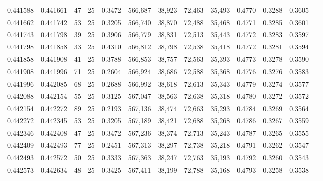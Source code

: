 \begin{tabular}{rrrrrrrrrrrrr}
0.441588 & 0.441661 &    47 &  25 &                                     0.3472 & 566,687 &  38,923 &  72,463 &  35,493 & 0.4770 & 0.3288 & 0.3605 \\
0.441662 & 0.441742 &    53 &  25 &                                     0.3205 & 566,740 &  38,870 &  72,488 &  35,468 & 0.4771 & 0.3285 & 0.3601 \\
0.441743 & 0.441798 &    39 &  25 &                                     0.3906 & 566,779 &  38,831 &  72,513 &  35,443 & 0.4772 & 0.3283 & 0.3597 \\
0.441798 & 0.441858 &    33 &  25 &                                     0.4310 & 566,812 &  38,798 &  72,538 &  35,418 & 0.4772 & 0.3281 & 0.3594 \\
0.441858 & 0.441908 &    41 &  25 &                                     0.3788 & 566,853 &  38,757 &  72,563 &  35,393 & 0.4773 & 0.3278 & 0.3590 \\
0.441908 & 0.441996 &    71 &  25 &                                     0.2604 & 566,924 &  38,686 &  72,588 &  35,368 & 0.4776 & 0.3276 & 0.3583 \\
0.441996 & 0.442085 &    68 &  25 &                                     0.2688 & 566,992 &  38,618 &  72,613 &  35,343 & 0.4779 & 0.3274 & 0.3577 \\
0.442088 & 0.442154 &    55 &  25 &                                     0.3125 & 567,047 &  38,563 &  72,638 &  35,318 & 0.4780 & 0.3272 & 0.3572 \\
0.442154 & 0.442272 &    89 &  25 &                                     0.2193 & 567,136 &  38,474 &  72,663 &  35,293 & 0.4784 & 0.3269 & 0.3564 \\
0.442272 & 0.442345 &    53 &  25 &                                     0.3205 & 567,189 &  38,421 &  72,688 &  35,268 & 0.4786 & 0.3267 & 0.3559 \\
0.442346 & 0.442408 &    47 &  25 &                                     0.3472 & 567,236 &  38,374 &  72,713 &  35,243 & 0.4787 & 0.3265 & 0.3555 \\
0.442409 & 0.442493 &    77 &  25 &                                     0.2451 & 567,313 &  38,297 &  72,738 &  35,218 & 0.4791 & 0.3262 & 0.3547 \\
0.442493 & 0.442572 &    50 &  25 &                                     0.3333 & 567,363 &  38,247 &  72,763 &  35,193 & 0.4792 & 0.3260 & 0.3543 \\
0.442573 & 0.442634 &    48 &  25 &                                     0.3425 & 567,411 &  38,199 &  72,788 &  35,168 & 0.4793 & 0.3258 & 0.3538 \\

\end{tabular}
